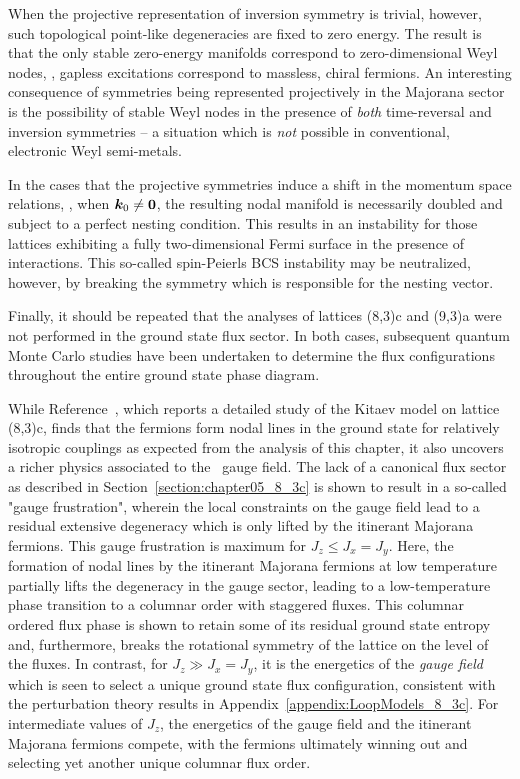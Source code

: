 When the projective representation of inversion symmetry is trivial, however, such topological point-like degeneracies are fixed to zero energy.
The result is that the only stable zero-energy manifolds correspond to zero-dimensional Weyl nodes, \ie, gapless excitations correspond to massless, chiral fermions.
An interesting consequence of symmetries being represented projectively in the Majorana sector is the possibility of stable Weyl nodes in the presence of \textit{both} time-reversal and inversion symmetries -- a situation which is \textit{not} possible in conventional, electronic Weyl semi-metals.

In the cases that the projective symmetries induce a shift in the momentum space relations, \eg, when $\bm{k}_0 \neq \bm{0}$, the resulting nodal manifold is necessarily doubled and subject to a perfect nesting condition.
This results in an instability for those lattices exhibiting a fully two-dimensional Fermi surface in the presence of interactions.
This so-called spin-Peierls BCS instability may be neutralized, however, by breaking the symmetry which is responsible for the nesting vector.

Finally, it should be repeated that the analyses of lattices (8,3)c and (9,3)a were not performed in the ground state flux sector.
In both cases, subsequent quantum Monte Carlo studies have been undertaken to determine the flux configurations throughout the entire ground state phase diagram.

While Reference~\cite{EschmannPRL2019}, which reports a detailed study of the Kitaev model on lattice (8,3)c, finds that the fermions form nodal lines in the ground state for relatively isotropic couplings as expected from the analysis of this chapter, it also uncovers a richer physics associated to the \ZZ~gauge field.
The lack of a canonical flux sector as described in Section~\ref{section:chapter05_8_3c} is shown to result in a so-called "gauge frustration", wherein the local constraints on the gauge field lead to a residual extensive degeneracy which is only lifted by the itinerant Majorana fermions.
This gauge frustration is maximum for $J_z \leq J_x = J_y$.
Here, the formation of nodal lines by the itinerant Majorana fermions at low temperature partially lifts the degeneracy in the gauge sector, leading to a low-temperature phase transition to a columnar order with staggered fluxes.
This columnar ordered flux phase is shown to retain some of its residual ground state entropy and, furthermore, breaks the rotational symmetry of the lattice on the level of the fluxes.
In contrast, for $J_z \gg J_x = J_y$, it is the energetics of the \textit{gauge field} which is seen to select a unique ground state flux configuration, consistent with the perturbation theory results in Appendix~\ref{appendix:LoopModels_8_3c}.
For intermediate values of $J_z$, the energetics of the gauge field and the itinerant Majorana fermions compete, with the fermions ultimately winning out and selecting yet another unique columnar flux order.

